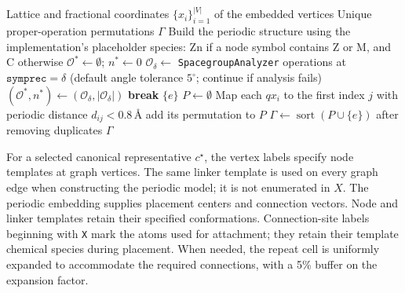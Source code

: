 \documentclass[a5paper, 10pt]{article}
\begin{document}
\begin{algorithm}[htbp]
\caption{Numerical construction of the embedded-net permutation group}
\label{alg:gamma_construction}
\scriptsize
\begin{algorithmic}[1]
\Require Lattice and fractional coordinates $\{x_i\}_{i=1}^{|V|}$ of the embedded vertices
\Ensure Unique proper-operation permutations $\Gamma$
\State Build the periodic structure using the implementation's placeholder species: Zn if a node symbol contains Z or M, and C otherwise
\State $\mathcal{O}^*\gets\emptyset$; $n^*\gets0$
    \State $\mathcal{O}_{\delta}\gets$ \texttt{SpacegroupAnalyzer} operations at $\texttt{symprec}=\delta$ (default angle tolerance $5^\circ$; continue if analysis fails)
        \State $(\mathcal{O}^*,n^*)\gets(\mathcal{O}_{\delta},|\mathcal{O}_{\delta}|)$
    \EndIf
     \State \textbf{break} \EndIf
\EndFor
{} \State \Return $\{e\}$ \EndIf
\State $P\gets\emptyset$
    \State Map each $q x_i$ to the first index $j$ with periodic distance $d_{ij}<0.8\,\text{\AA}$
     \State add its permutation to $P$ \EndIf
\EndFor
\State $\Gamma\gets\operatorname{sort}(P\cup\{e\})$ after removing duplicates
\State \Return $\Gamma$
\end{algorithmic}
\end{algorithm}

For a selected canonical representative $c^\star$, the vertex labels specify node templates at graph vertices. The same linker template is used on every graph edge when constructing the periodic model; it is not enumerated in $X$. The periodic embedding supplies placement centers and connection vectors. Node and linker templates retain their specified conformations. Connection-site labels beginning with \texttt{X} mark the atoms used for attachment; they retain their template chemical species during placement. When needed, the repeat cell is uniformly expanded to accommodate the required connections, with a 5\% buffer on the expansion factor.
\end{document}
